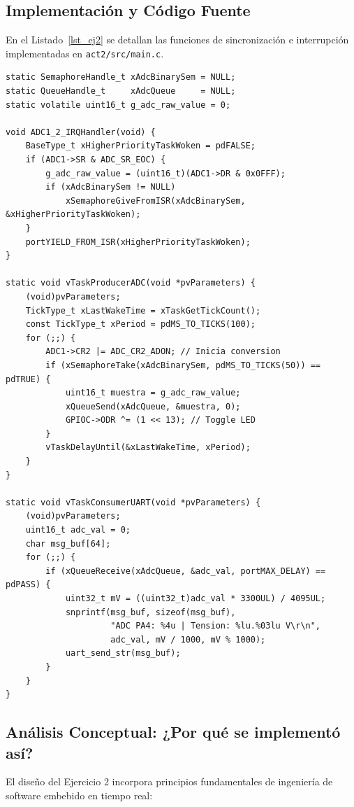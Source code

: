 \documentclass{plantilla}
\begin{document}
\subsection{Implementación y Código Fuente}
En el Listado~\ref{lst_ej2} se detallan las funciones de sincronización e interrupción implementadas en \texttt{act2/src/main.c}.

\begin{lstlisting}[caption={Fragmento de Productor, Consumidor e ISR (\texttt{act2/src/main.c})}, label=lst_ej2]
static SemaphoreHandle_t xAdcBinarySem = NULL;
static QueueHandle_t     xAdcQueue     = NULL;
static volatile uint16_t g_adc_raw_value = 0;

void ADC1_2_IRQHandler(void) {
    BaseType_t xHigherPriorityTaskWoken = pdFALSE;
    if (ADC1->SR & ADC_SR_EOC) {
        g_adc_raw_value = (uint16_t)(ADC1->DR & 0x0FFF);
        if (xAdcBinarySem != NULL)
            xSemaphoreGiveFromISR(xAdcBinarySem, &xHigherPriorityTaskWoken);
    }
    portYIELD_FROM_ISR(xHigherPriorityTaskWoken);
}

static void vTaskProducerADC(void *pvParameters) {
    (void)pvParameters;
    TickType_t xLastWakeTime = xTaskGetTickCount();
    const TickType_t xPeriod = pdMS_TO_TICKS(100);
    for (;;) {
        ADC1->CR2 |= ADC_CR2_ADON; // Inicia conversion
        if (xSemaphoreTake(xAdcBinarySem, pdMS_TO_TICKS(50)) == pdTRUE) {
            uint16_t muestra = g_adc_raw_value;
            xQueueSend(xAdcQueue, &muestra, 0);
            GPIOC->ODR ^= (1 << 13); // Toggle LED
        }
        vTaskDelayUntil(&xLastWakeTime, xPeriod);
    }
}

static void vTaskConsumerUART(void *pvParameters) {
    (void)pvParameters;
    uint16_t adc_val = 0;
    char msg_buf[64];
    for (;;) {
        if (xQueueReceive(xAdcQueue, &adc_val, portMAX_DELAY) == pdPASS) {
            uint32_t mV = ((uint32_t)adc_val * 3300UL) / 4095UL;
            snprintf(msg_buf, sizeof(msg_buf),
                     "ADC PA4: %4u | Tension: %lu.%03lu V\r\n",
                     adc_val, mV / 1000, mV % 1000);
            uart_send_str(msg_buf);
        }
    }
}
\end{lstlisting}

\subsection{Análisis Conceptual: ¿Por qué se implementó así?}
El diseño del Ejercicio 2 incorpora principios fundamentales de ingeniería de software embebido en tiempo real:
\end{document}
